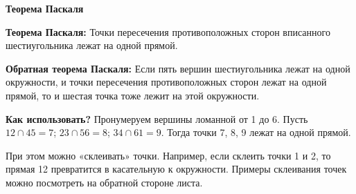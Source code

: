 \documentclass{article}
\begin{document}
\large
	
	\begin{center}
		\textbf{Теорема Паскаля}
	\end{center}
	
	\textbf{Теорема Паскаля:} Точки пересечения противоположных сторон вписанного шестиугольника лежат на одной прямой.
	
	\textbf{Обратная теорема Паскаля:} Если пять вершин шестиугольника лежат на одной окружности, и точки пересечения противоположных сторон лежат на одной прямой, то и шестая точка тоже лежит на этой окружности.
	
	\textbf{Как использовать?} Пронумеруем вершины ломанной от 1 до 6.
	Пусть $12 \cap 45 = 7$; $23 \cap 56 = 8$; $34 \cap 61 = 9$.
	Тогда точки 7, 8, 9 лежат на одной прямой.
	
	При этом можно «склеивать» точки.
	Например, если склеить точки 1 и 2, то прямая 12
	превратится в касательную к окружности.
	Примеры склеивания точек можно посмотреть на обратной стороне листа.
	
\end{document}
